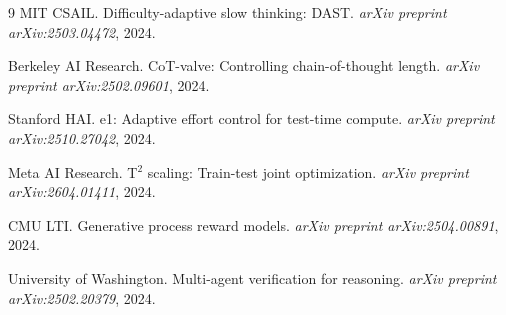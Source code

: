 \documentclass[10pt,preprint]{neurips_2024}
\begin{document}
\begin{thebibliography}{9}
MIT CSAIL.
\newblock Difficulty-adaptive slow thinking: DAST.
\newblock \emph{arXiv preprint arXiv:2503.04472}, 2024.

Berkeley AI Research.
\newblock CoT-valve: Controlling chain-of-thought length.
\newblock \emph{arXiv preprint arXiv:2502.09601}, 2024.

Stanford HAI.
\newblock e1: Adaptive effort control for test-time compute.
\newblock \emph{arXiv preprint arXiv:2510.27042}, 2024.

Meta AI Research.
\newblock T$^2$ scaling: Train-test joint optimization.
\newblock \emph{arXiv preprint arXiv:2604.01411}, 2024.

CMU LTI.
\newblock Generative process reward models.
\newblock \emph{arXiv preprint arXiv:2504.00891}, 2024.

University of Washington.
\newblock Multi-agent verification for reasoning.
\newblock \emph{arXiv preprint arXiv:2502.20379}, 2024.

\end{thebibliography}
\end{document}
